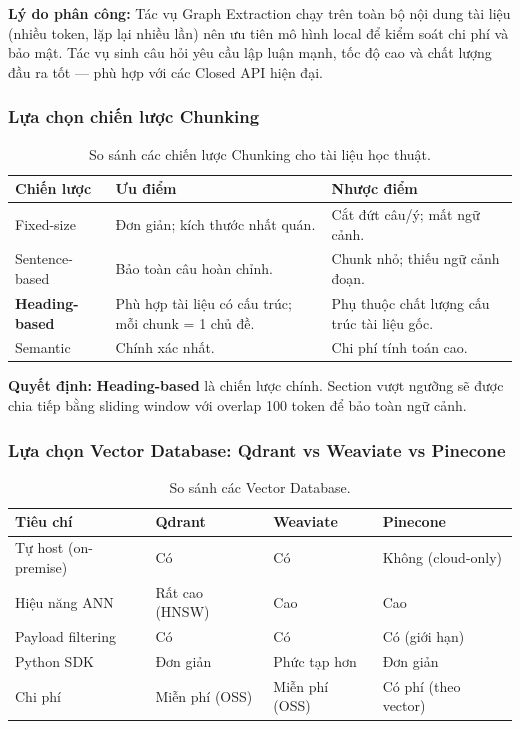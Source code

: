 \noindent\textbf{Lý do phân công:} Tác vụ Graph Extraction chạy trên toàn bộ
nội dung tài liệu (nhiều token, lặp lại nhiều lần) nên ưu tiên mô hình local
để kiểm soát chi phí và bảo mật. Tác vụ sinh câu hỏi yêu cầu lập luận mạnh,
tốc độ cao và chất lượng đầu ra tốt --- phù hợp với các Closed API hiện đại.

\subsubsection{Lựa chọn chiến lược Chunking}

\begin{table}[H]
    \centering
    \caption{So sánh các chiến lược Chunking cho tài liệu học thuật.}
    \label{tab:chunking-choice}
    \begin{tabular}{p{3cm}p{5.5cm}p{6cm}}
        \toprule
        \textbf{Chiến lược} & \textbf{Ưu điểm} & \textbf{Nhược điểm} \\
        \midrule
        Fixed-size & Đơn giản; kích thước nhất quán. & Cắt đứt câu/ý; mất ngữ cảnh. \\
        Sentence-based & Bảo toàn câu hoàn chỉnh. & Chunk nhỏ; thiếu ngữ cảnh đoạn. \\
        \textbf{Heading-based} & Phù hợp tài liệu có cấu trúc; mỗi chunk = 1 chủ đề. & Phụ thuộc chất lượng cấu trúc tài liệu gốc. \\
        Semantic & Chính xác nhất. & Chi phí tính toán cao. \\
        \bottomrule
    \end{tabular}
\end{table}

\noindent\textbf{Quyết định:} \textbf{Heading-based} là chiến lược chính.
Section vượt ngưỡng sẽ được chia tiếp bằng sliding window với overlap 100
token để bảo toàn ngữ cảnh.

\subsubsection{Lựa chọn Vector Database: Qdrant vs Weaviate vs Pinecone}

\begin{table}[H]
    \centering
    \caption{So sánh các Vector Database.}
    \label{tab:vdb-choice}
    \begin{tabular}{p{3cm}p{3.5cm}p{3.5cm}p{4.5cm}}
        \toprule
        \textbf{Tiêu chí} & \textbf{Qdrant} & \textbf{Weaviate} & \textbf{Pinecone} \\
        \midrule
        Tự host (on-premise)  & Có & Có & Không (cloud-only) \\
        Hiệu năng ANN         & Rất cao (HNSW) & Cao & Cao \\
        Payload filtering     & Có & Có & Có (giới hạn) \\
        Python SDK            & Đơn giản & Phức tạp hơn & Đơn giản \\
        Chi phí               & Miễn phí (OSS) & Miễn phí (OSS) & Có phí (theo vector) \\
        \bottomrule
    \end{tabular}
\end{table}

